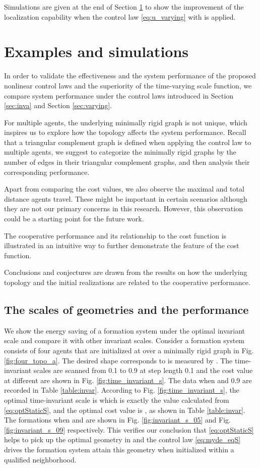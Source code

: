 \documentclass[times]{rncauth}
\begin{document}
Simulations are given at the end of Section \ref{sec:exp} to show
the improvement of the localization capability when the control law
\eqref{eq:u_varying} with  is
applied.

\section{Examples and simulations}\label{sec:exp}
In order to validate the effectiveness and the system performance of
the proposed nonlinear control laws and the superiority of the
time-varying scale function, we compare system performance under the
control laws introduced in Section \ref{sec:inva} and Section
\ref{sec:varying}.

For multiple agents, the underlying  minimally rigid graph is not
unique, which inspires us to explore how the topology affects the
system performance. Recall that a triangular complement graph is
defined when applying the control law to multiple agents, we suggest
to categorize the minimally rigid graphs by the number of edges in
their
 triangular complement graphs, and then analysis their corresponding performance.

Apart from comparing the cost values, we also observe the maximal
and total distance agents travel. These might be important in
certain scenarios although they are not our primary concerns in this
research. However, this observation could be a starting point for
the future work.

The cooperative performance and its relationship to the cost
function is illustrated in an intuitive way  to further demonstrate
the feature of the cost function.

Conclusions and conjectures are drawn from the results on how the
underlying topology and the initial realizations are related to the
cooperative performance.





\subsection{The scales of geometries and the performance}
We show the energy saving of a formation system under the optimal
invariant scale  and  compare it with other invariant scales.
Consider a formation system consists of four agents that are
initialized at  over a minimally
rigid graph  in Fig. \ref{fig:four_topo_a}. The desired shape
corresponds to  is measured by . The
time-invariant scales are scanned from 0.1 to 0.9 at step length 0.1
and the cost value  at different  are shown in Fig.
\ref{fig:time_invariant_s}. The data when  and 0.9 are
recorded in Table \ref{table:invar}. According to Fig.
\ref{fig:time_invariant_s}, the optimal time-invariant scale is
 which is exactly the value calculated from
\eqref{eq:optStaticS}, and the optimal cost value is ,
as shown in Table \ref{table:invar}. The formations when  and
 are shown in Fig. \ref{fig:invariant_s_05} and Fig.
\ref{fig:invariant_s_09} respectively. This verifies our conclusion
that \eqref{eq:optStaticS} helps to pick up the optimal geometry in
 and the control law \eqref{eq:myde_eqS} drives
the formation system attain this geometry when initialized within a
qualified neighborhood.
\end{document}
